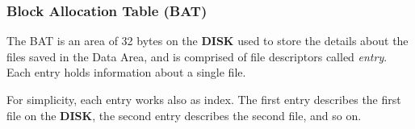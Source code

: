\documentclass[a4paper,11pt]{article}
\begin{document}
        \subsubsection{Block Allocation Table (BAT)}
        The BAT is an area of 32 bytes on the \textbf{DISK} used to store the 
        details about the files saved in the Data Area, and is comprised of file
        descriptors called \textit{entry}. Each entry holds information about a
        single file.

        For simplicity, each entry works also as index. The first entry 
        describes the first file on the \textbf{DISK}, the second entry 
        describes the second file, and so on. 
\end{document}
